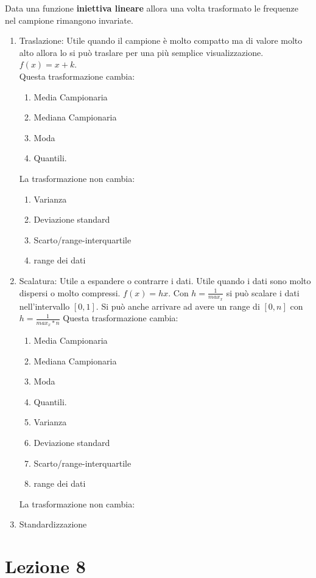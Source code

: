 \documentclass{article}
\begin{document}
Data una funzione \textbf{iniettiva lineare} allora una volta trasformato le frequenze nel campione rimangono invariate.

\begin{enumerate}
  \item Traslazione: Utile quando il campione è molto compatto ma di valore molto alto allora lo si può traslare per una più semplice visualizzazione. $f(x)=x+k$. \\ Questa trasformazione cambia:
    \begin{enumerate}
      \item Media Campionaria
      \item Mediana Campionaria
      \item Moda
      \item Quantili.
    \end{enumerate}
  La trasformazione non cambia:
    \begin{enumerate}
      \item Varianza 
      \item Deviazione standard  
      \item Scarto/range-interquartile
      \item range dei dati
    \end{enumerate}
  \item Scalatura: Utile a espandere o contrarre i dati. Utile quando i dati sono molto dispersi o molto compressi. $f(x)=hx$. Con $h=\frac{1}{max_x}$ si può scalare i dati nell'intervallo $[0,1]$. Si può anche arrivare ad avere un range di $[0,n]$ con $h=\frac{1}{max_x*n}$
    Questa trasformazione cambia:
    \begin{enumerate}
      \item Media Campionaria
      \item Mediana Campionaria
      \item Moda
      \item Quantili.
      \item Varianza 
      \item Deviazione standard  
      \item Scarto/range-interquartile
      \item range dei dati
    \end{enumerate}
  La trasformazione non cambia:
    \item Standardizzazione  


\end{enumerate}

\section*{Lezione 8}
\end{document}
